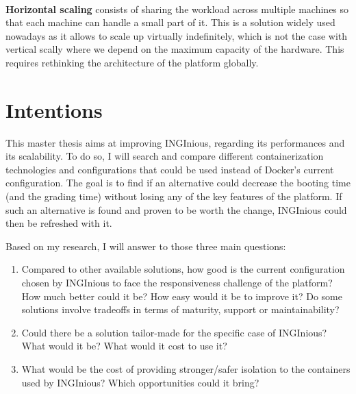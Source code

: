 \paragraph{} \textbf{Horizontal scaling} consists of sharing the workload across multiple machines so that each machine can handle a small part of it.  This is a solution widely used nowadays as it allows to scale up virtually indefinitely, which is not the case with vertical scally where we depend on the maximum capacity of the hardware.  This requires rethinking the architecture of the platform globally.

\section{Intentions}
This master thesis aims at improving INGInious, regarding its performances and its scalability.  To do so, I will search and compare different containerization technologies and configurations that could be used instead of Docker's current configuration.  The goal is to find if an alternative could decrease the booting time (and the grading time) without losing any of the key features of the platform.  If such an alternative is found and proven to be worth the change, INGInious could then be refreshed with it.

Based on my research, I will answer to those three main questions:
\begin{enumerate}
  \item Compared to other available solutions, how good is the current configuration chosen by INGInious to face the responsiveness challenge of the platform?  How much better could it be?  How easy would it be to improve it?  Do some solutions involve tradeoffs in terms of maturity, support or maintainability?
  \item Could there be a solution tailor-made for the specific case of INGInious?  What would it be?  What would it cost to use it?
  \item What would be the cost of providing stronger/safer isolation to the containers used by INGInious?  Which opportunities could it bring?
\end{enumerate}
